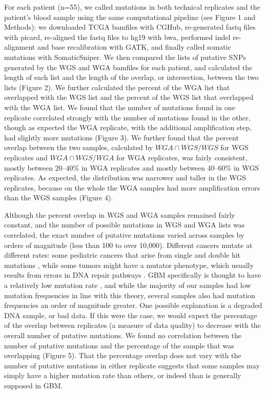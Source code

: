 \documentclass[11pt]{article} %
\begin{document}
For each patient (n=55), we called mutations in both technical replicates and the patient's blood sample using the same computational pipeline (see Figure 1 and Methods): we downloaded TCGA bamfiles with CGHub, re-generated fastq files with picard, re-aligned the fastq files to hg19 with bwa, performed indel re-alignment and base recalibration with GATK, and finally called somatic mutations with SomaticSniper. We then compared the lists of putative SNPs generated by the WGS and WGA bamfiles for each patient, and calculated the length of each list and the length of the overlap, or intersection, between the two lists (Figure 2). We further calculated the percent of the WGA list that overlapped with the WGS list and the percent of the WGS list that overlapped with the WGA list. We found that the number of mutations found in one replicate correlated strongly with the number of mutations found in the other, though as expected the WGA replicate, with the additional amplification step, had slightly more mutations (Figure 3). We further found that the percent overlap between the two samples, calculated by $WGA \cap WGS/WGS$ for WGS replicates and $WGA \cap WGS/WGA$ for WGA replicates, was fairly consistent, mostly between 20--40\% in WGA replicates and mostly between 40--60\% in WGS replicates. As expected, the distribution was narrower and taller in the WGS replicates, because on the whole the WGA samples had more amplification errors than the WGS samples (Figure 4).

Although the percent overlap in WGS and WGA samples remained fairly constant, and the number of possible mutations in WGS and WGA lists was correlated, the exact number of putative mutations varied across samples by orders of magnitude (less than 100 to over 10,000). Different cancers mutate at different rates: some pediatric cancers that arise from single and double hit mutations \cite{pediatric}, while some tumors might have a mutator phenotype, which usually results from errors in DNA repair pathways \cite{mutator}. GBM specifically is thought to have a relatively low mutation rate \cite{GBM_mut_rate}, and while the majority of our samples had low mutation frequencies in line with this theory, several samples also had mutation frequencies an order of magnitude greater. One possible explanation is a degraded DNA sample, or bad data. If this were the case, we would expect the percentage of the overlap between replicates (a measure of data quality) to decrease with the overall number of putative mutations. We found no correlation between the number of putative mutations and the percentage of the sample that was overlapping (Figure 5). That the percentage overlap does not vary with the number of putative mutations in either replicate suggests that some samples may simply have a higher mutation rate than others, or indeed than is generally supposed in GBM.
\end{document}
